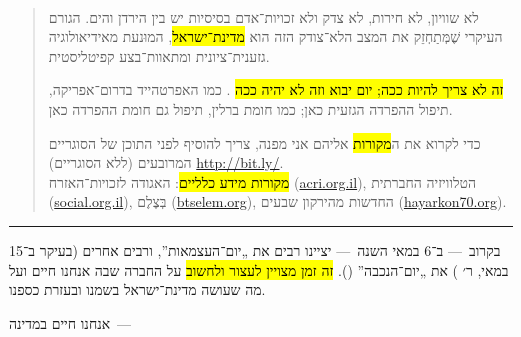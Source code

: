 \\

\begin{quote}
לא שוויון, לא חירות, לא צדק ולא זכויות־אדם בסיסיות יש בין הירדן והים. הגורם העיקרי שֶׁמְּתַחְזֵק את המצב הלא־צודק הזה הוא \hl{מדינת־ישראל}, המוּנעת מאידיאולוגיה גזענית־ציונית ומתאוות־בצע קפיטליסטית.

\hl{זה לא צריך להיות ככה; יום יבוא וזה לא יהיה ככה }. כמו האפרטהייד בדרום־אפריקה, תיפול ההפרדה הגזעית כאן; כמו חומת ברלין, תיפול גם חומת ההפרדה כאן.


{\small כדי לקרוא את ה\hl{מקורות} אליהם אני מפנה, צריך להוסיף לפני התוכן של הסוגריים המרובעים (ללא הסוגריים) {\mbox{\url{http://bit.ly/}}}.\\
\hl{מקורות מידע כלליים}: האגודה לזכויות־האזרח (\mbox{\url{acri.org.il}}), הטלוויזיה החברתית (\mbox{\url{social.org.il}}), בְּצֶלֶם (\mbox{\url{btselem.org}}), החדשות מהירקון שבעים (\mbox{\url{hayarkon70.org}}).}
\end{quote}

\hrule

בקרוב~— ב־6 במאי השנה~— יציינו רבים את „יום־העצמ{\small א}ות”, ורבים אחרים (בעיקר ב־15 במאי, ר׳ ) את „יום־הנכבה” (). \hl{זה זמן מצויין לעצור ולחשוב} על החברה שבה אנחנו חיים ועל מה שעושה מדינת־ישראל בשמנו ובעזרת כספנו.

{\setlength\parindent{-0.5em}\Large אנחנו חיים במדינה~—}

